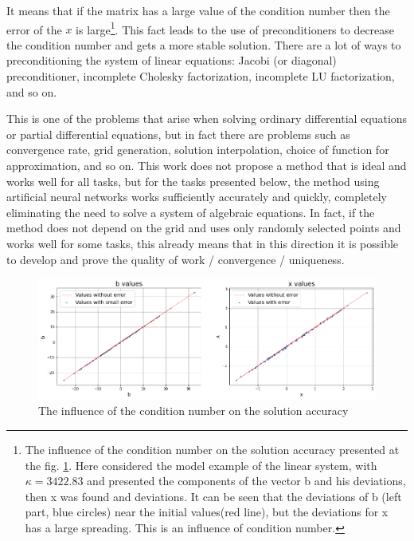 It means that if the matrix has a large value of the condition number then the error of the $x$ is large\footnote{The influence of the condition number on the solution accuracy presented at the fig. \ref{fig:ill_condition_demo}. Here considered the model example of the linear system, with $\kappa = 3422.83$ and presented the components of the vector b and his deviations, then x was found and deviations. It can be seen that the deviations of b (left part, blue circles) near the initial values(red line), but the deviations for x has a large spreading. This is an influence of condition number.}.
This fact leads to the use of preconditioners to decrease the condition number and gets a more stable solution. There are a lot of ways to preconditioning the system of linear equations: Jacobi (or diagonal) preconditioner, incomplete Cholesky factorization, incomplete LU factorization, and so on. 

This is one of the problems that arise when solving ordinary differential equations or partial differential equations, but in fact there are problems such as convergence rate, grid generation, solution interpolation, choice of function for approximation, and so on. This work does not propose a method that is ideal and works well for all tasks, but for the tasks presented below, the method using artificial neural networks works sufficiently accurately and quickly, completely eliminating the need to solve a system of algebraic equations. In fact, if the method does not depend on the grid and uses only randomly selected points and works well for some tasks, this already means that in this direction it is possible to develop and prove the quality of work / convergence / uniqueness.

\begin{figure}[h]
	\centering
	\includegraphics[width=\textwidth]{images/chapter2/ill_condition_demo.png}
	\caption{The influence of the condition number on the solution accuracy}
	\label{fig:ill_condition_demo}
\end{figure}